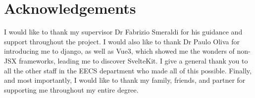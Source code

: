 \section*{\centering Acknowledgements}

I would like to thank my supervisor Dr Fabrizio Smeraldi for his guidance and support throughout the project. I would also like to thank Dr Paulo Oliva for introducing me to django, as well as Vue3, which showed me the wonders of non-JSX frameworks, leading me to discover SvelteKit. I give a general thank you to all the other staff in the EECS department who made all of this possible. Finally, and most importantly, I would like to thank my family, friends, and partner for supporting me throughout my entire degree.

